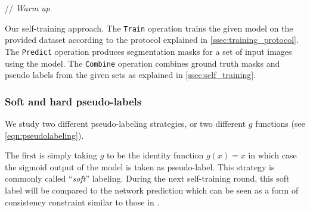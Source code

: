 \begin{algorithm}[t]
  \SetAlgoLined
  // \textit{Warm up}  \\
  \caption{Our self-training approach. The \texttt{Train} operation trains the given model on the provided dataset according to the protocol explained in  \cref{ssec:training_protocol}. The \texttt{Predict} operation produces segmentation masks for a set of input images using the model. The \texttt{Combine} operation combines ground truth masks and pseudo labels from the given sets as explained in \cref{ssec:self_training}.}
  \label{algo:selftraining}
\end{algorithm}

\subsubsection{Soft and hard pseudo-labels}
\label{sssec:softandhardlabels}

We study two different pseudo-labeling strategies, or two different $g$ functions (see \cref{eqn:pseudolabeling}). 

The first is simply taking $g$ to be the identity function $g(x) = x$ in which case the sigmoid output of the model is taken as pseudo-label. This strategy is commonly called  ``\textit{soft}'' labeling. During the next self-training round, this soft label will be compared to the network prediction which can be seen as a form of consistency constraint similar to those in \cite{laine2016temporal,tarvainen2017mean, sohn2020fixmatch}.

